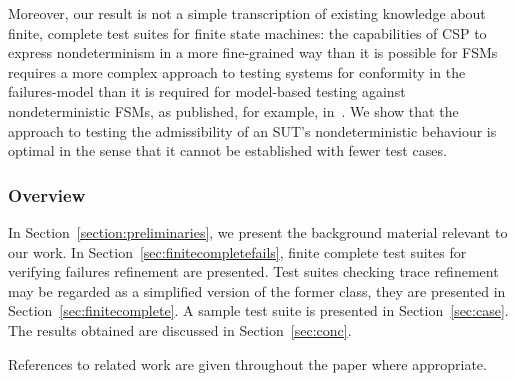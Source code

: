 Moreover, our result is not a simple transcription of existing knowledge
about finite, complete test suites for finite state machines: the
capabilities of CSP to express nondeterminism in a more fine-grained way than
it is possible for FSMs requires a more complex approach to testing systems
for conformity in the failures-model than it is required for model-based
testing against nondeterministic FSMs, as published, for example,
in~\cite{hierons_testing_2004,DBLP:conf/hase/PetrenkoY14}. We show that the approach to testing the admissibility of an SUT's nondeterministic behaviour is optimal in the
sense that it cannot be established with fewer test cases.



\subsubsection*{Overview}
In Section~\ref{section:preliminaries},
we present the background material relevant to our work. In Section~\ref{sec:finitecompletefails}, finite complete test suites for verifying failures refinement are presented. Test suites checking trace refinement may be regarded as a simplified version of the former class, they are presented in Section~\ref{sec:finitecomplete}. A sample test suite is presented in Section~\ref{sec:case}. The results obtained are discussed in Section~\ref{sec:conc}.

References to related work are given throughout the paper where appropriate.


